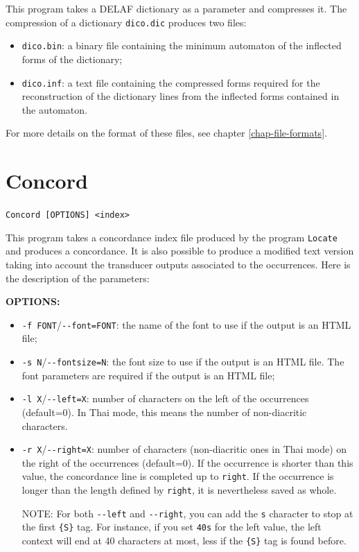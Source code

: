 \bigskip
\noindent This program takes a DELAF dictionary as a parameter and compresses it.
The compression of a dictionary \verb+dico.dic+ produces two files:
\begin{itemize}
  \item \verb+dico.bin+: a binary file containing the minimum automaton of the inflected forms of the dictionary;
  \item \verb+dico.inf+: a text file containing the compressed forms required for the reconstruction of the dictionary
  lines from the inflected forms contained in the automaton.
\end{itemize}

\bigskip
\noindent For more details on the format of these files, see chapter
\ref{chap-file-formats}.






\section{Concord}
\verb+Concord [OPTIONS] <index>+

\bigskip
\noindent This program takes a concordance index file produced by the program
\verb+Locate+ and produces a concordance. It is also possible to produce a
modified text version taking into account the transducer outputs associated to
the occurrences. Here is the description of the parameters:

\bigskip
\noindent \textbf{OPTIONS:}
\begin{itemize}
  \item \verb+-f FONT+/\verb+--font=FONT+: the name of the font to use if the
  output is an HTML file;
  \item \verb+-s N+/\verb+--fontsize=N+: the font size to use if the output is
  an HTML file. The font parameters are required if the output is an HTML file;
  \item \verb+-l X+/\verb+--left=X+: number of characters on the left of the 
  occurrences (default=0). In Thai mode, this means the number of non-diacritic
  characters.
  \item \verb+-r X+/\verb+--right=X+: number of characters (non-diacritic ones in Thai mode) on
  the right of the occurrences (default=0). If the occurrence is shorter than
  this value, the concordance line is completed up to \verb+right+. If the occurrence is longer
  than the length defined by \verb+right+, it is nevertheless saved as whole.
  
  \bigskip
  NOTE: For both \verb+--left+ and \verb+--right+, you can add the \verb+s+
  character to stop at the first \verb+{S}+ tag. For instance, if you
  set \verb+40s+ for the left value, the left context will end at 40 characters
  at most, less if the \verb+{S}+ tag is found before.
\end{itemize}

